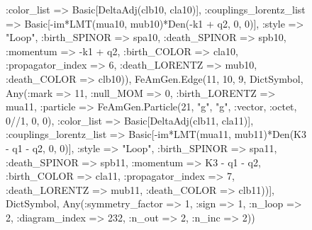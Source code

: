 \documentclass{revtex4}
\begin{document}
\begin{figure}[!htb]
\begin{center}
{:color_list => Basic[DeltaAdj(clb10, cla10)], :couplings_lorentz_list => Basic[-im*LMT(mua10, mub10)*Den(-k1 + q2, 0, 0)], :style => "Loop", :birth_SPINOR => spa10, :death_SPINOR => spb10, :momentum => -k1 + q2, :birth_COLOR => cla10, :propagator_index => 6, :death_LORENTZ => mub10, :death_COLOR => clb10)), FeAmGen.Edge(11, 10, 9, Dict{Symbol, Any}(:mark => 11, :null_MOM => 0, :birth_LORENTZ => mua11, :particle => FeAmGen.Particle(21, "g", "g", :vector, :octet, 0//1, 0, 0), :color_list => Basic[DeltaAdj(clb11, cla11)], :couplings_lorentz_list => Basic[-im*LMT(mua11, mub11)*Den(K3 - q1 - q2, 0, 0)], :style => "Loop", :birth_SPINOR => spa11, :death_SPINOR => spb11, :momentum => K3 - q1 - q2, :birth_COLOR => cla11, :propagator_index => 7, :death_LORENTZ => mub11, :death_COLOR => clb11))], Dict{Symbol, Any}(:symmetry_factor => 1, :sign => 1, :n_loop => 2, :diagram_index => 232, :n_out => 2, :n_inc => 2)) 
}
\end{center}
\end{figure}
\end{document}
